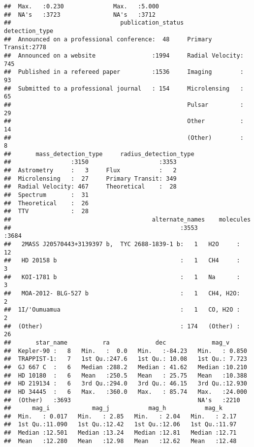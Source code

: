 \documentclass[]{article}
\begin{document}
\begin{verbatim}
##  Max.   :0.230              Max.   :5.000  
##  NA's   :3723               NA's   :3712   
##                               publication_status         detection_type
##  Announced on a professional conference:  48     Primary Transit:2778  
##  Announced on a website                :1994     Radial Velocity: 745  
##  Published in a refereed paper         :1536     Imaging        :  93  
##  Submitted to a professional journal   : 154     Microlensing   :  65  
##                                                  Pulsar         :  29  
##                                                  Other          :  14  
##                                                  (Other)        :   8  
##       mass_detection_type     radius_detection_type
##                 :3150                    :3353     
##  Astrometry     :   3     Flux           :   2     
##  Microlensing   :  27     Primary Transit: 349     
##  Radial Velocity: 467     Theoretical    :  28     
##  Spectrum       :  31                              
##  Theoretical    :  26                              
##  TTV            :  28                              
##                                        alternate_names    molecules   
##                                                :3553           :3684  
##   2MASS J20570443+3139397 b,  TYC 2688-1839-1 b:   1   H2O     :  12  
##   HD 20158 b                                   :   1   CH4     :   3  
##   KOI-1781 b                                   :   1   Na      :   3  
##   MOA-2012- BLG-527 b                          :   1   CH4, H2O:   2  
##  1I/'Oumuamua                                  :   1   CO, H2O :   2  
##  (Other)                                       : 174   (Other) :  26  
##       star_name          ra             dec             mag_v       
##  Kepler-90 :   8   Min.   :  0.0   Min.   :-84.23   Min.   : 0.850  
##  TRAPPIST-1:   7   1st Qu.:247.6   1st Qu.: 10.08   1st Qu.: 7.723  
##  GJ 667 C  :   6   Median :288.2   Median : 41.62   Median :10.210  
##  HD 10180  :   6   Mean   :250.5   Mean   : 25.75   Mean   :10.388  
##  HD 219134 :   6   3rd Qu.:294.0   3rd Qu.: 46.15   3rd Qu.:12.930  
##  HD 34445  :   6   Max.   :360.0   Max.   : 85.74   Max.   :24.000  
##  (Other)   :3693                                    NA's   :2210    
##      mag_i            mag_j           mag_h           mag_k      
##  Min.   : 0.017   Min.   : 2.85   Min.   : 2.04   Min.   : 2.17  
##  1st Qu.:11.090   1st Qu.:12.42   1st Qu.:12.06   1st Qu.:11.97  
##  Median :12.501   Median :13.24   Median :12.81   Median :12.71  
##  Mean   :12.280   Mean   :12.98   Mean   :12.62   Mean   :12.48  

\end{verbatim}
\end{document}

